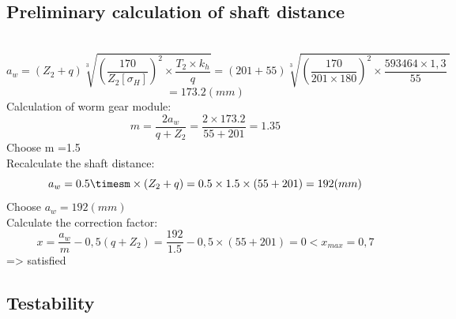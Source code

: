 \subsection{Preliminary calculation of shaft distance}\\
 $$a_w=\left(Z_2+q\right)\sqrt[3]{\left(\frac{170}{Z_2\left[\sigma_H\right]}\right)^2\times\frac{T_2\times k_h}{q}}
=\left(201+55\right)\sqrt[3]{\left(\frac{170}{201\times 180}\right)^2\times\frac{593464\times1,3}{55}\ }$$
$$=173.2 (mm)$$
Calculation of worm gear module:\\
 $$m=\frac{2a_w}{q+Z_2}=\frac{2\times173.2}{55+201}=1.35$$
Choose m =1.5\\
Recalculate the shaft distance:
$$a_w=0.5\timesm\times (Z_2 +q)=0.5\times1.5\times(55+201) = 192 (mm)$$
	Choose $a_w=192 (mm)$\\
Calculate the correction factor:
	 $$x=\frac{a_w}{m}-0,5\left(q+Z_2\right)=\frac{192}{1.5}-0,5\times\left(55+201\right)=0<x_{max}=0,7$$
=> satisfied
\subsection{Testability}	 \\

